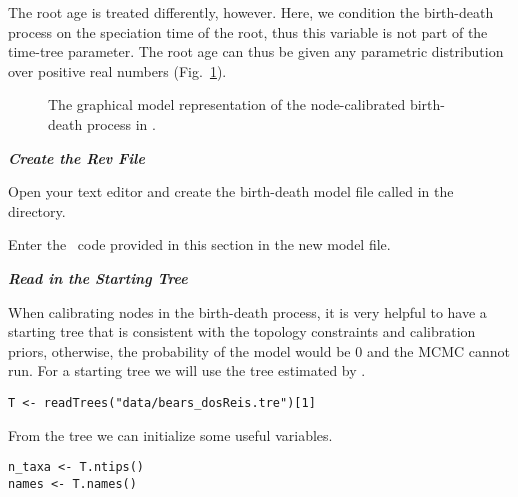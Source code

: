 The root age is treated differently, however. 
Here, we condition the birth-death process on the speciation time of the root, thus this variable is not part of the time-tree parameter. 
The root age can thus be given any parametric distribution over positive real numbers (Fig.~\ref{m_BDCal:fig}).

\begin{figure}[h!]
\centering
{}
\caption{\small The graphical model representation of the node-calibrated birth-death process in \RevBayes.}
\label{m_BDCal:fig}
\end{figure}

\textbf{\textit{Create the Rev File}}

{\begin{framed}
Open your text editor and create the birth-death model file called {\textcolor{red}{}} in the  directory.

Enter the \Rev~code provided in this section in the new model file.
\end{framed}}


\textbf{\textit{Read in the Starting Tree}}

When calibrating nodes in the birth-death process, it is very helpful to have a starting tree that is consistent with the topology constraints and calibration priors, otherwise, the probability of the model would be 0 and the MCMC cannot run.
For a starting tree we will use the tree estimated by \citet{dosReis2012}. 
{\tt \begin{snugshade*}
\begin{lstlisting}
T <- readTrees("data/bears_dosReis.tre")[1]
\end{lstlisting}
\end{snugshade*}}

From the tree we can initialize some useful variables.
{\tt \begin{snugshade*}
\begin{lstlisting}
n_taxa <- T.ntips()
names <- T.names()
\end{lstlisting}
\end{snugshade*}}


